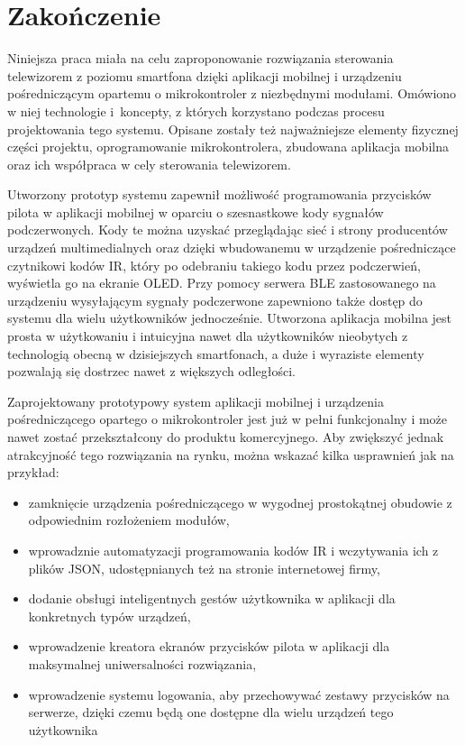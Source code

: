 \documentclass[12pt,twoside]{article}
\begin{document}
\section{Zakończenie}

Niniejsza praca miała na celu zaproponowanie rozwiązania sterowania telewizorem z poziomu smartfona dzięki aplikacji mobilnej i urządzeniu pośredniczącym opartemu o mikrokontroler z niezbędnymi modułami. Omówiono w niej technologie i~koncepty, z których korzystano podczas procesu projektowania tego systemu. Opisane zostały też najważniejsze elementy fizycznej części projektu, oprogramowanie mikrokontrolera, zbudowana aplikacja mobilna oraz ich współpraca w cely sterowania telewizorem.

Utworzony prototyp systemu zapewnił możliwość programowania przycisków pilota w aplikacji mobilnej w oparciu o szesnastkowe kody sygnałów podczerwonych. Kody te można uzyskać przeglądając sieć i strony producentów urządzeń multimedialnych oraz dzięki wbudowanemu w urządzenie pośredniczące czytnikowi kodów IR, który po odebraniu takiego kodu przez podczerwień, wyświetla go na ekranie OLED. Przy pomocy serwera BLE zastosowanego na urządzeniu wysyłającym sygnały podczerwone zapewniono także dostęp do systemu dla wielu użytkowników jednocześnie. Utworzona aplikacja mobilna jest prosta w użytkowaniu i intuicyjna nawet dla użytkowników nieobytych z technologią obecną w dzisiejszych smartfonach, a duże i wyraziste elementy pozwalają się dostrzec nawet z większych odległości.

Zaprojektowany prototypowy system aplikacji mobilnej i urządzenia pośredniczącego opartego o mikrokontroler jest już w pełni funkcjonalny i może nawet zostać przekształcony do produktu komercyjnego. Aby zwiększyć jednak atrakcyjność tego rozwiązania na rynku, można wskazać kilka usprawnień jak na przykład:
\begin{itemize}[label=-,labelsep=0.4cm,leftmargin=0.65cm]
   \item zamknięcie urządzenia pośredniczącego w wygodnej prostokątnej obudowie z odpowiednim rozłożeniem modułów,
   \item wprowadznie automatyzacji programowania kodów IR i wczytywania ich z plików JSON, udostępnianych też na stronie internetowej firmy,
   \item dodanie obsługi inteligentnych gestów użytkownika w aplikacji dla konkretnych typów urządzeń,
   \item wprowadzenie kreatora ekranów przycisków pilota w aplikacji dla maksymalnej uniwersalności rozwiązania,
   \item wprowadzenie systemu logowania, aby przechowywać zestawy przycisków na serwerze, dzięki czemu będą one dostępne dla wielu urządzeń tego użytkownika
   
\end{itemize}
\end{document}
